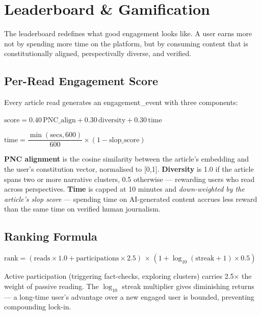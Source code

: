 \documentclass[9pt,a4paper,twocolumn]{article}
\newcommand{\code}[1]{{\ttfamily\small\color{steel}#1}}
\begin{document}
\section{Leaderboard \& Gamification}

The leaderboard redefines what good engagement looks like. A user earns more not by spending more time on the platform, but by consuming content that is constitutionally aligned, perspectivally diverse, and verified.

\subsection{Per-Read Engagement Score}

Every article read generates an \code{engagement\_event} with three components:

\begin{formulabox}
\small
\centering
$\text{score} = 0.40\,\text{PNC\_align} + 0.30\,\text{diversity} + 0.30\,\text{time}$

\smallskip
$\text{time} = \dfrac{\min(\text{secs}, 600)}{600} \times (1 - \text{slop\_score})$
\end{formulabox}

\textbf{PNC alignment} is the cosine similarity between the article's embedding and the user's constitution vector, normalised to [0,1]. \textbf{Diversity} is 1.0 if the article spans two or more narrative clusters, 0.5 otherwise — rewarding users who read across perspectives. \textbf{Time} is capped at 10 minutes and \textit{down-weighted by the article's slop score} — spending time on AI-generated content accrues less reward than the same time on verified human journalism.

\subsection{Ranking Formula}

\begin{formulabox}
\small
\centering
$\text{rank} = (\text{reads} \times 1.0 + \text{participations} \times 2.5)$
$\times\;(1 + \log_{10}(\text{streak}+1) \times 0.5)$
\end{formulabox}

Active participation (triggering fact-checks, exploring clusters) carries 2.5× the weight of passive reading. The \(\log_{10}\) streak multiplier gives diminishing returns — a long-time user's advantage over a new engaged user is bounded, preventing compounding lock-in.
\end{document}
